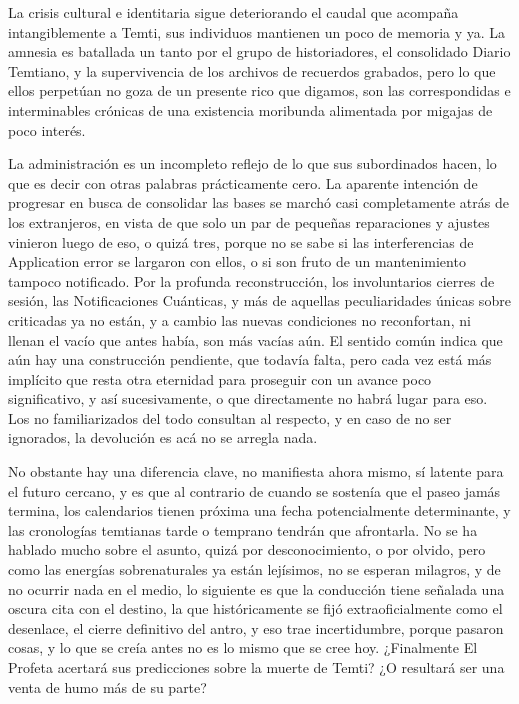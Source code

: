 \documentclass[
  spanish,
]{book}
\begin{document}
La crisis cultural e identitaria sigue deteriorando el caudal que acompaña intangiblemente a Temti, sus individuos mantienen un poco de memoria y ya. La amnesia es batallada un tanto por el grupo de historiadores, el consolidado Diario Temtiano, y la supervivencia de los archivos de recuerdos grabados, pero lo que ellos perpetúan no goza de un presente rico que digamos, son las correspondidas e interminables crónicas de una existencia moribunda alimentada por migajas de poco interés.

La administración es un incompleto reflejo de lo que sus subordinados hacen, lo que es decir con otras palabras prácticamente cero. La aparente intención de progresar en busca de consolidar las bases se marchó casi completamente atrás de los extranjeros, en vista de que solo un par de pequeñas reparaciones y ajustes vinieron luego de eso, o quizá tres, porque no se sabe si las interferencias de Application error se largaron con ellos, o si son fruto de un mantenimiento tampoco notificado. Por la profunda reconstrucción, los involuntarios cierres de sesión, las Notificaciones Cuánticas, y más de aquellas peculiaridades únicas sobre criticadas ya no están, y a cambio las nuevas condiciones no reconfortan, ni llenan el vacío que antes había, son más vacías aún. El sentido común indica que aún hay una construcción pendiente, que todavía falta, pero cada vez está más implícito que resta otra eternidad para proseguir con un avance poco significativo, y así sucesivamente, o que directamente no habrá lugar para eso. Los no familiarizados del todo consultan al respecto, y en caso de no ser ignorados, la devolución es acá no se arregla nada.

No obstante hay una diferencia clave, no manifiesta ahora mismo, sí latente para el futuro cercano, y es que al contrario de cuando se sostenía que el paseo jamás termina, los calendarios tienen próxima una fecha potencialmente determinante, y las cronologías temtianas tarde o temprano tendrán que afrontarla. No se ha hablado mucho sobre el asunto, quizá por desconocimiento, o por olvido, pero como las energías sobrenaturales ya están lejísimos, no se esperan milagros, y de no ocurrir nada en el medio, lo siguiente es que la conducción tiene señalada una oscura cita con el destino, la que históricamente se fijó extraoficialmente como el desenlace, el cierre definitivo del antro, y eso trae incertidumbre, porque pasaron cosas, y lo que se creía antes no es lo mismo que se cree hoy. ¿Finalmente El Profeta acertará sus predicciones sobre la muerte de Temti? ¿O resultará ser una venta de humo más de su parte?
\end{document}
